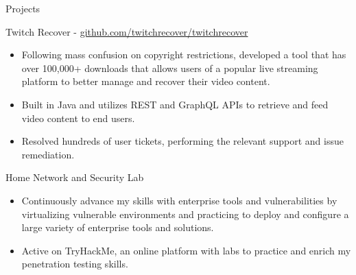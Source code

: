 \documentclass{article}
\newlength{\tabin}
\newlength{\secsep}
\newcommand{\lineunder}{\vspace*{-8pt} \\ \hspace*{-6pt} \hrulefill \\ \vspace*{-15pt}}
\newenvironment{tabbedsection}[1]{
  \begin{list}{}{
      \setlength{\itemsep}{0pt}
      \setlength{\labelsep}{0pt}
      \setlength{\labelwidth}{0pt}
      \setlength{\leftmargin}{\tabin}
      \setlength{\rightmargin}{\tabin}
      \setlength{\listparindent}{0pt}
      \setlength{\parsep}{0pt}
      \setlength{\parskip}{0pt}
      \setlength{\partopsep}{0pt}
      \setlength{\topsep}{#1}
    }
  \item[]
}{\end{list}}
\newenvironment{resume_section}[1]{
  \filbreak
  \vspace{2\secsep}
  \textsc{\color{blue}\large#1}
  \lineunder
  \begin{tabbedsection}{\secsep}
}{\end{tabbedsection}}
\newenvironment{resume_subsection}[2][]{
  \textbf{\color{BlueViolet}#2} \hfill {\normalsize #1} \hspace{-5em} 
  \begin{tabbedsection}{0.5\secsep}
}{\end{tabbedsection}}
\newenvironment{subitems}{
  \renewcommand{\labelitemi}{-}
  \begin{itemize}
      \setlength{\labelsep}{1em}
}{\end{itemize}}
\begin{document}
\begin{resume_section}{Projects}
\begin{resume_subsection}{Twitch Recover - \faGithub \hspace{0.01cm} \href{https://github.com/twitchrecover/twitchrecover}{github.com/twitchrecover/twitchrecover}}
		\begin{subitems}
                \item Following mass confusion on copyright restrictions, developed a tool that has over 100,000+ downloads that allows users of a popular live streaming platform to better manage and recover their video content.
    			\item Built in Java and utilizes REST and GraphQL APIs to retrieve and feed video content to end users.
    			\item Resolved hundreds of user tickets, performing the relevant support and issue remediation.
		\end{subitems}
	\end{resume_subsection}
	\vspace{2\secsep}
	\vspace{2\secsep}
  	\begin{resume_subsection}{Home Network and Security Lab}
  		\begin{subitems}
            \item Continuously advance my skills with enterprise tools and vulnerabilities by virtualizing vulnerable environments and practicing to deploy and configure a large variety of enterprise tools and solutions. 
  			\item Active on TryHackMe, an online platform with labs to practice and enrich my penetration testing skills.
  		\end{subitems}
  	\end{resume_subsection}
\end{resume_section}

\vspace{2\secsep}
\end{document}
